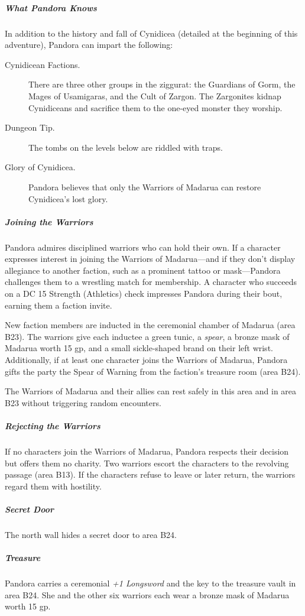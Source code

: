 \documentclass[10pt,a4paper,twoside,bg=print,twocolumn,openany,nodeprecatedcode]{dndbook}
\begin{document}
\subparagraph{What Pandora Knows}
In addition to the history and fall of Cynidicea (detailed at the beginning of this adventure), Pandora can impart the following:


\begin{description}
\item[Cynidicean Factions.]
There are three other groups in the ziggurat: the Guardians of Gorm, the Mages of Usamigaras, and the Cult of Zargon. The Zargonites kidnap Cynidiceans and sacrifice them to the one-eyed monster they worship.
\item[Dungeon Tip.]
The tombs on the levels below are riddled with traps.
\item[Glory of Cynidicea.]
Pandora believes that only the Warriors of Madarua can restore Cynidicea's lost glory.
\end{description}

\subparagraph{Joining the Warriors}
Pandora admires disciplined warriors who can hold their own. If a character expresses interest in joining the Warriors of Madarua—and if they don't display allegiance to another faction, such as a prominent tattoo or mask—Pandora challenges them to a wrestling match for membership. A character who succeeds on a DC 15 Strength (Athletics) check impresses Pandora during their bout, earning them a faction invite.

New faction members are inducted in the ceremonial chamber of Madarua (area B23). The warriors give each inductee a green tunic, a \textit{spear}, a bronze mask of Madarua worth 15 gp, and a small sickle-shaped brand on their left wrist. Additionally, if at least one character joins the Warriors of Madarua, Pandora gifts the party the Spear of Warning from the faction's treasure room (area B24).

The Warriors of Madarua and their allies can rest safely in this area and in area B23 without triggering random encounters.

\subparagraph{Rejecting the Warriors}
If no characters join the Warriors of Madarua, Pandora respects their decision but offers them no charity. Two warriors escort the characters to the revolving passage (area B13). If the characters refuse to leave or later return, the warriors regard them with hostility.

\subparagraph{Secret Door}
The north wall hides a secret door to area B24.

\subparagraph{Treasure}
Pandora carries a ceremonial \textit{+1 Longsword} and the key to the treasure vault in area B24. She and the other six warriors each wear a bronze mask of Madarua worth 15 gp.
\end{document}
